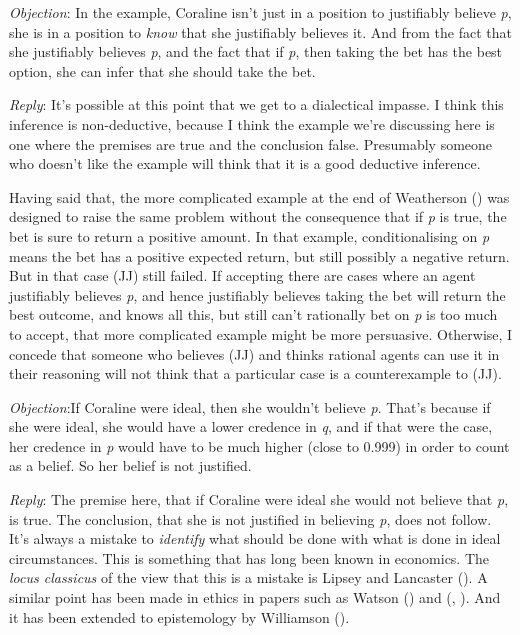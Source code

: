 \documentclass[
  10pt,
  letterpaper,
  DIV=11,
  numbers=noendperiod,
  twoside]{scrartcl}
\begin{document}
\emph{Objection}: In the example, Coraline isn't just in a position to
justifiably believe \emph{p}, she is in a position to \emph{know} that
she justifiably believes it. And from the fact that she justifiably
believes \emph{p}, and the fact that if \emph{p}, then taking the bet
has the best option, she can infer that she should take the bet.

\emph{Reply}: It's possible at this point that we get to a dialectical
impasse. I think this inference is non-deductive, because I think the
example we're discussing here is one where the premises are true and the
conclusion false. Presumably someone who doesn't like the example will
think that it is a good deductive inference.

Having said that, the more complicated example at the end of Weatherson
() was designed to raise the
same problem without the consequence that if \emph{p} is true, the bet
is sure to return a positive amount. In that example, conditionalising
on \emph{p} means the bet has a positive expected return, but still
possibly a negative return. But in that case (JJ) still failed. If
accepting there are cases where an agent justifiably believes \emph{p},
and hence justifiably believes taking the bet will return the best
outcome, and knows all this, but still can't rationally bet on \emph{p}
is too much to accept, that more complicated example might be more
persuasive. Otherwise, I concede that someone who believes (JJ) and
thinks rational agents can use it in their reasoning will not think that
a particular case is a counterexample to (JJ).

\emph{Objection}:If Coraline were ideal, then she wouldn't believe
\emph{p}. That's because if she were ideal, she would have a lower
credence in \emph{q}, and if that were the case, her credence in
\emph{p} would have to be much higher (close to 0.999) in order to count
as a belief. So her belief is not justified.

\emph{Reply}: The premise here, that if Coraline were ideal she would
not believe that \emph{p}, is true. The conclusion, that she is not
justified in believing \emph{p}, does not follow. It's always a mistake
to \emph{identify} what should be done with what is done in ideal
circumstances. This is something that has long been known in economics.
The \emph{locus classicus} of the view that this is a mistake is Lipsey
and Lancaster (). A similar point
has been made in ethics in papers such as Watson
() and
(,
). And it has been extended to
epistemology by Williamson ().
\end{document}
